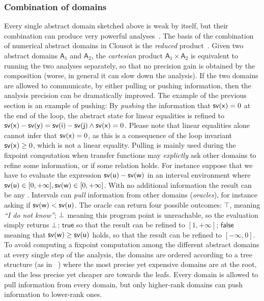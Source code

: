 \documentclass{llncs}
\begin{document}
\subsubsection{Combination of domains}
Every single abstract domain sketched above is weak by itself, but their combination can produce very powerful analyses~\cite{FeretEtAl06}.
The basis of the combination of numerical abstract domains in Clousot is the \emph{reduced} product~\cite{CousotCousot77-1-POPL}.
Given two abstract domains $\mathsf{A}_1$ and $\mathsf{A}_2$, the \emph{cartesian} product $\mathsf{A}_1 \times \mathsf{A}_2$ is equivalent to running the two analyses separately, so that no precision gain is obtained by the composition (worse, in general it can slow down the analysis).
If the two domains are allowed to communicate, by either pulling or pushing information, then the analysis precision can be dramatically improved.
The example of the previous section is an example of pushing: 
By \emph{pushing} the information that $\mathsf{sv(x)} = 0$ at the end of the loop, the abstract state for linear equalities  is refined to $\mathsf{sv(x)} - \mathsf{sv(y)} = \mathsf{sv(i)} - \mathsf{sv(j)} \wedge \mathsf{sv(x)} = 0$. 
Please note that linear equalities alone cannot infer that $\mathsf{sv(x)} = 0$, as this is a consequence of the  loop invariant $\mathsf{sv(x)} \geq 0$, which is not a linear equality.
Pulling is mainly used during the fixpoint computation when transfer functions may \emph{explictly} ask other domains to refine some information, or if some relation holds.
For instance suppose that we have to evaluate the expression $\mathsf{sv(u)} - \mathsf{sv(w)}$ in an interval environment where $\mathsf{sv(u)} \in [0, +\infty], \mathsf{sv(w)} \in [0, +\infty]$.
With no additional information the result can be any .
Intervals can \emph{pull} information from other domains (\emph{oracles}), for instance asking if $\mathsf{sv(w)} < \mathsf{sv(u)}$. 
The oracle can return four possible outcomes: $\top$, meaning \emph{``I do not know''}; $\bot$ meaning this program point is unreachable, so the evaluation simply returns $\bot$; $\mathsf{true}$ so that the result can be refined to $[1, +\infty]$; $\mathsf{false}$ meaning that $\mathsf{sv(w)} \geq \mathsf{sv(u)}$ holds, so that the result can be refined to $[-\infty, 0]$.
To avoid computing a fixpoint computation among the different abstract domains at every single step of the analysis, the domains are ordered according to a tree structure (as in ~\cite{FeretEtAl06}) where the most precise yet expensive domains are at the root, and the less precise yet cheaper are towards the leafs.
Every domain is allowed to pull information from every domain, but only higher-rank domains can push information to lower-rank ones.
\end{document}
